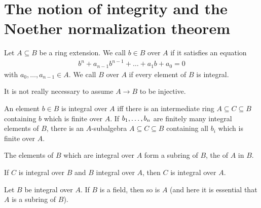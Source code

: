 \documentclass[a4paper,parskip=half,numbers=enddot, DIV=12]{scrreprt}
\begin{document}
	\section{The notion of integrity and the Noether normalization theorem}
	\begin{defi}
		Let $A\subseteq B$ be a ring extension. We call $b\in B$  over $A$ if it satisfies an equation
		\begin{align*}
		b^n +a_{n-1}b^{n-1}+\ldots+a_1b+a_0 =0
		\end{align*}
		with $a_0,\ldots,a_{n-1}\in A$. We call $B$  over $A$ if every element of $B$ is integral.
	\end{defi}
	\begin{rem}
		It is not really necessary to assume $A\to B$ to be injective.
	\end{rem}
	\begin{prop}
		\begin{alphanumerate}
			\item An element $b\in B$ is integral over $A$ iff there is an intermediate ring $A\subseteq C\subseteq B$ containing $b$ which is finite over $A$. If $b_1,\ldots, b_n$ are finitely many integral elements of $B$, there is an $A$-subalgebra $A\subseteq C\subseteq B$ containing all $b_i$ which is finite over $A$.%
			\item The elements of $B$ which are integral over $A$ form a subring of $B$, the  of $A$ in $B$.
			\item If $C$ is integral over $B$ and $B$ integral over $A$, then $C$ is integral over $A$.
			\item Let $B$ be integral over $A$. If $B$ is a field, then so is $A$ (and here it is essential that $A$ is a subring of $B$).
		\end{alphanumerate}
		
	\end{prop}
	
\end{document}
